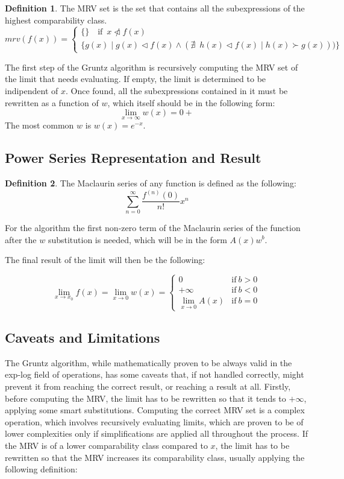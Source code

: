 \documentclass{article}
\theoremstyle{plain}
\theoremstyle{definition}
\newtheorem*{defn*}{Definition}
\theoremstyle{algorithm}
\begin{document}
	\begin{defn*}
		The MRV set is the set that contains all the subexpressions of the highest comparability class.
		\[
		mrv(f(x)) = \begin{cases}
			\{\} \quad \text{if} \enspace x \ntriangleleft f(x) \\
			\{g(x) \mid g(x) \triangleleft f(x) \wedge (\nexists \enspace h(x) \triangleleft f(x) \mid h(x) \succ g(x)))\}
		\end{cases}
		\]
	\end{defn*} \label{defn:mrv}
	
	The first step of the Gruntz algorithm is recursively computing the MRV set of the limit that needs evaluating. If empty, the limit is determined to be indipendent of \(x\). 
	Once found, all the subexpressions contained in it must be rewritten as a function of \(w\), which itself should be in the following form: 
	\[
	\lim_{x \to \infty}{w(x)} = 0+
	\]
	The most common \(w\) is \(w(x) = e^{-x}\).
	
	\subsection{Power Series Representation and Result}
	
	\begin{defn*}
		The Maclaurin series of any function is defined as the following:
		\[
		\sum_{n=0}^{\infty}{\frac{f^{(n)}(0)}{n!} x^{n}} \tag{3} \label{eq:maclaurin}
		\] 
	\end{defn*}
	
	For the algorithm the first non-zero term of the Maclaurin series of the function after the \(w\) substitution is needed, which will be in the form \(A(x)w^b\).
	
	The final result of the limit will then be the following:
	
	\[
	\lim_{x \to x_{0}}{f(x)} = \lim_{x \to 0}{w(x)} = \begin{cases}
		0 &\text{if} \: b > 0 \\
		+\infty &\text{if} \: b < 0\\
		\lim_{x \to 0}{A(x)} &\text{if} \: b = 0
	\end{cases} \tag{4} \label{eq:result}
	\]
	
	\subsection{Caveats and Limitations}
	
	The Gruntz algorithm, while mathematically proven to be always valid in the exp-log field of operations, has some caveats that, if not handled correctly, might prevent it from reaching the correct result, or reaching a result at all. Firstly, before computing the MRV, the limit has to be rewritten so that it tends to \(+\infty\), applying some smart substitutions.
	Computing the correct MRV set is a complex operation, which involves recursively evaluating limits, which are proven to be of lower complexities only if simplifications are applied all throughout the process. If the MRV is of a lower comparability class compared to \({x}\), the limit has to be rewritten so that the MRV increases its comparability class, usually applying the following definition:
	
\end{document}
